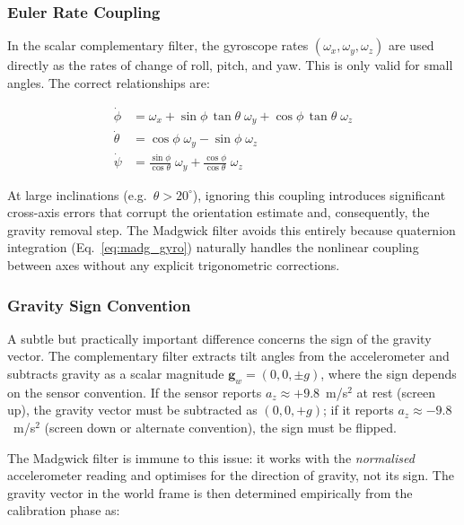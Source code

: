 \subsubsection{Euler Rate Coupling}

In the scalar complementary filter, the gyroscope rates
$(\omega_x, \omega_y, \omega_z)$ are used directly as the rates of change
of roll, pitch, and yaw.  This is only valid for small angles.  The correct
relationships are:

\begin{align}
  \dot{\phi}   &= \omega_x
    + \sin\phi\,\tan\theta\;\omega_y
    + \cos\phi\,\tan\theta\;\omega_z
  \label{eq:euler_rate_roll} \\[3pt]
  \dot{\theta} &= \cos\phi\;\omega_y - \sin\phi\;\omega_z
  \label{eq:euler_rate_pitch} \\[3pt]
  \dot{\psi}   &= \frac{\sin\phi}{\cos\theta}\;\omega_y
    + \frac{\cos\phi}{\cos\theta}\;\omega_z
  \label{eq:euler_rate_yaw}
\end{align}

\noindent At large inclinations (e.g.\ $\theta > 20^\circ$), ignoring this
coupling introduces significant cross-axis errors that corrupt the
orientation estimate and, consequently, the gravity removal step.  The
Madgwick filter avoids this entirely because quaternion integration
(Eq.~\ref{eq:madg_gyro}) naturally handles the nonlinear coupling
between axes without any explicit trigonometric corrections.

\subsubsection{Gravity Sign Convention}

A subtle but practically important difference concerns the sign of the
gravity vector.  The complementary filter extracts tilt angles from the
accelerometer and subtracts gravity as a scalar magnitude
$\mathbf{g}_w = (0, 0, \pm g)$, where the sign depends on the sensor
convention.  If the sensor reports $a_z \approx +9.8$~m/s$^2$ at rest
(screen up), the gravity vector must be subtracted as $(0, 0, +g)$; if it
reports $a_z \approx -9.8$~m/s$^2$ (screen down or alternate convention),
the sign must be flipped.

The Madgwick filter is immune to this issue: it works with the
\emph{normalised} accelerometer reading and optimises for the direction
of gravity, not its sign.  The gravity vector in the world frame is then
determined empirically from the calibration phase as:

